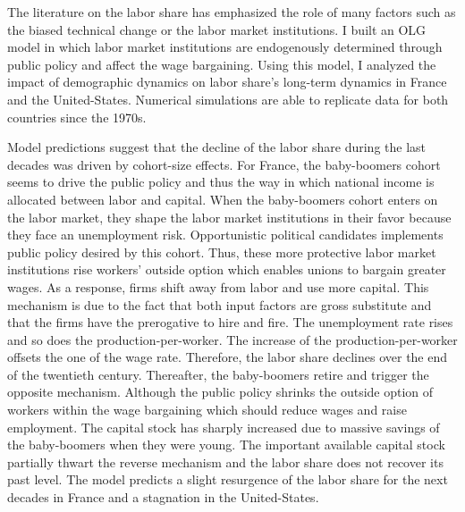 The literature on the labor share has emphasized the role of many factors such as the biased technical change or the labor market institutions. I built an OLG model in which labor market institutions are endogenously determined through public policy and affect the wage bargaining. Using this model, I analyzed the impact of demographic dynamics on labor share's long-term dynamics in France and the United-States. Numerical simulations are able to replicate data for both countries since the 1970s.


Model predictions suggest that the decline of the labor share during the last decades was driven by cohort-size effects. 
For France, the baby-boomers cohort seems to drive the public policy and thus the way in which national income is allocated between labor and capital.
When the baby-boomers cohort enters on the labor market, they shape the labor market institutions in their favor because they face an unemployment risk. Opportunistic political candidates implements public policy desired by this cohort. 
Thus, these more protective labor market institutions rise workers' outside option which enables unions to bargain greater wages. 
As a response, firms shift away from labor and use more capital. This mechanism is due to the fact that both input factors are gross substitute and that the firms have the prerogative to hire and fire.
The unemployment rate rises and so does the production-per-worker. 
The increase of the production-per-worker offsets the one of the wage rate. 
Therefore, the labor share declines over the end of the twentieth century. 
Thereafter, the baby-boomers retire and trigger the opposite mechanism. 
Although the public policy shrinks the outside option of workers within the wage bargaining which should reduce wages and raise employment. 
The capital stock has sharply increased due to massive savings of the baby-boomers when they were young. 
The important available capital stock partially thwart the reverse mechanism and the labor share does not recover its past level.
The model predicts a slight resurgence of the labor share for the next decades in France and a stagnation in the United-States.

